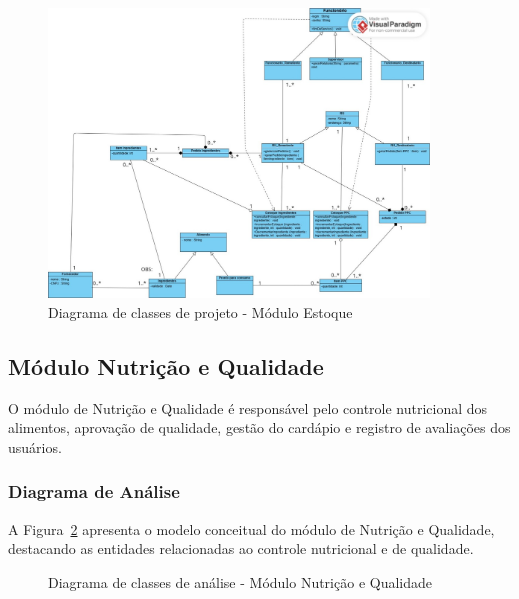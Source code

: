 \documentclass[12pt,a4paper]{article}
\begin{document}
\begin{figure}[H]
    \centering
    \includegraphics[width=0.9\textwidth]{diagramas/Diagramas de classe/Estoque_Diagrama_Projeto.jpg}
    \caption{Diagrama de classes de projeto - Módulo Estoque}
    \label{fig:classe_estoque_projeto}
\end{figure}

\subsection{Módulo Nutrição e Qualidade}

O módulo de Nutrição e Qualidade é responsável pelo controle nutricional dos alimentos, aprovação de qualidade, gestão do cardápio e registro de avaliações dos usuários.

\subsubsection{Diagrama de Análise}

A Figura~\ref{fig:classe_nutricao_analise} apresenta o modelo conceitual do módulo de Nutrição e Qualidade, destacando as entidades relacionadas ao controle nutricional e de qualidade.

\begin{figure}[H]
    \centering
    \caption{Diagrama de classes de análise - Módulo Nutrição e Qualidade}
    \label{fig:classe_nutricao_analise}
\end{figure}
\end{document}
